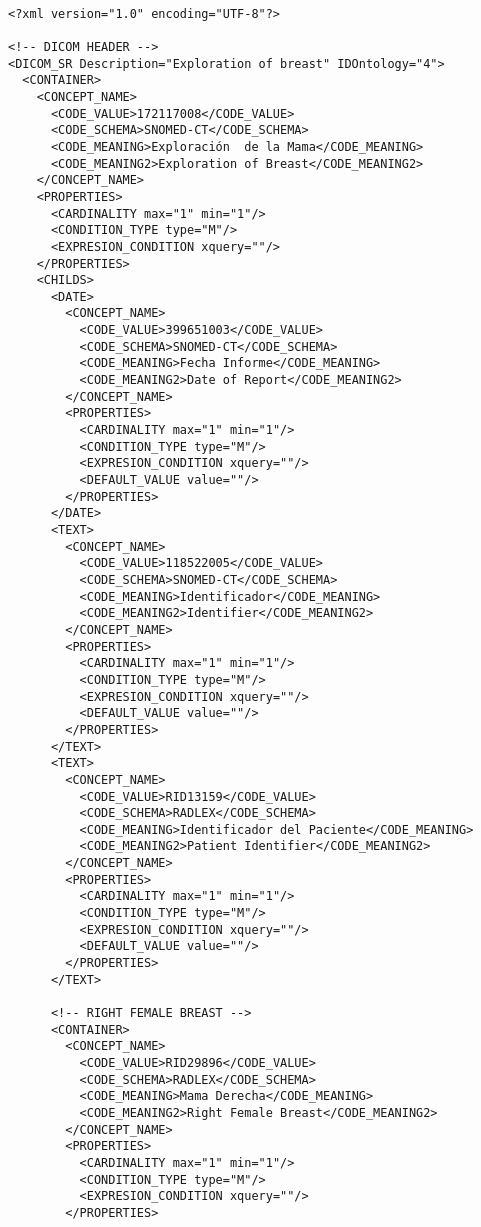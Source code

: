 \lstset{escapechar=@,style=dicom}
\renewcommand*\lstlistingname{Fichero}

\begin{lstlisting}[label=dicom-report,caption=Informe estructurado de una exploración de mama]
     
<?xml version="1.0" encoding="UTF-8"?>

<!-- DICOM HEADER -->
<DICOM_SR Description="Exploration of breast" IDOntology="4">
  <CONTAINER>
    <CONCEPT_NAME>
      <CODE_VALUE>172117008</CODE_VALUE>
      <CODE_SCHEMA>SNOMED-CT</CODE_SCHEMA>
      <CODE_MEANING>Exploración  de la Mama</CODE_MEANING>
      <CODE_MEANING2>Exploration of Breast</CODE_MEANING2>
    </CONCEPT_NAME>
    <PROPERTIES>
      <CARDINALITY max="1" min="1"/>
      <CONDITION_TYPE type="M"/>
      <EXPRESION_CONDITION xquery=""/>
    </PROPERTIES>
    <CHILDS>
      <DATE>
        <CONCEPT_NAME>
          <CODE_VALUE>399651003</CODE_VALUE>
          <CODE_SCHEMA>SNOMED-CT</CODE_SCHEMA>
          <CODE_MEANING>Fecha Informe</CODE_MEANING>
          <CODE_MEANING2>Date of Report</CODE_MEANING2>
        </CONCEPT_NAME>
        <PROPERTIES>
          <CARDINALITY max="1" min="1"/>
          <CONDITION_TYPE type="M"/>
          <EXPRESION_CONDITION xquery=""/>
          <DEFAULT_VALUE value=""/>
        </PROPERTIES>
      </DATE>
      <TEXT>
        <CONCEPT_NAME>
          <CODE_VALUE>118522005</CODE_VALUE>
          <CODE_SCHEMA>SNOMED-CT</CODE_SCHEMA>
          <CODE_MEANING>Identificador</CODE_MEANING>
          <CODE_MEANING2>Identifier</CODE_MEANING2>
        </CONCEPT_NAME>
        <PROPERTIES>
          <CARDINALITY max="1" min="1"/>
          <CONDITION_TYPE type="M"/>
          <EXPRESION_CONDITION xquery=""/>
          <DEFAULT_VALUE value=""/>
        </PROPERTIES>
      </TEXT>
      <TEXT>
        <CONCEPT_NAME>
          <CODE_VALUE>RID13159</CODE_VALUE>
          <CODE_SCHEMA>RADLEX</CODE_SCHEMA>
          <CODE_MEANING>Identificador del Paciente</CODE_MEANING>
          <CODE_MEANING2>Patient Identifier</CODE_MEANING2>
        </CONCEPT_NAME>
        <PROPERTIES>
          <CARDINALITY max="1" min="1"/>
          <CONDITION_TYPE type="M"/>
          <EXPRESION_CONDITION xquery=""/>
          <DEFAULT_VALUE value=""/>
        </PROPERTIES>
      </TEXT>

      <!-- RIGHT FEMALE BREAST -->
      <CONTAINER>
        <CONCEPT_NAME>
          <CODE_VALUE>RID29896</CODE_VALUE>
          <CODE_SCHEMA>RADLEX</CODE_SCHEMA>
          <CODE_MEANING>Mama Derecha</CODE_MEANING>
          <CODE_MEANING2>Right Female Breast</CODE_MEANING2>
        </CONCEPT_NAME>
        <PROPERTIES>
          <CARDINALITY max="1" min="1"/>
          <CONDITION_TYPE type="M"/>
          <EXPRESION_CONDITION xquery=""/>
        </PROPERTIES>


\end{lstlisting}
